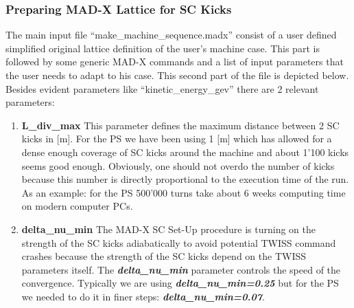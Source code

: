 \subsubsection{Preparing MAD-X Lattice for SC Kicks}\label{APPENDIX3}
The main input file ``make\_machine\_sequence.madx'' consist of a
user defined simplified original lattice definition of the user's
machine case. This part is followed by some generic MAD-X commands
and a list of input parameters that the user needs to adapt to his case.
This second part of the file is depicted below. Besides evident
parameters like ``kinetic\_energy\_gev'' there are 2 relevant
parameters:
\begin{enumerate}
\item{\bf L\_div\_max}\newline
  This parameter defines the maximum distance between 2 SC kicks in
  [m]. For the PS we have been using 1 [m] which has allowed for a
  dense enough coverage of SC kicks around the machine and about 1'100
  kicks seems good enough. Obviously, one should not overdo the number
  of kicks because this number is directly proportional to the
  execution time of the run. As an example: for the PS 500'000 turns
  take about 6 weeks computing time on modern computer PCs.
\item{\bf delta\_nu\_min}\newline
  The MAD-X SC Set-Up procedure is turning on the strength of the SC
  kicks adiabatically to avoid potential TWISS command crashes because the
  strength of the SC kicks depend on the TWISS parameters itself. The
  {\it\bf delta\_nu\_min} parameter controls the speed of the
  convergence. Typically we are using {\it\bf delta\_nu\_min=0.25} but
  for the PS we needed to do it in finer steps: {\it\bf
    delta\_nu\_min=0.07}.
\end{enumerate}
